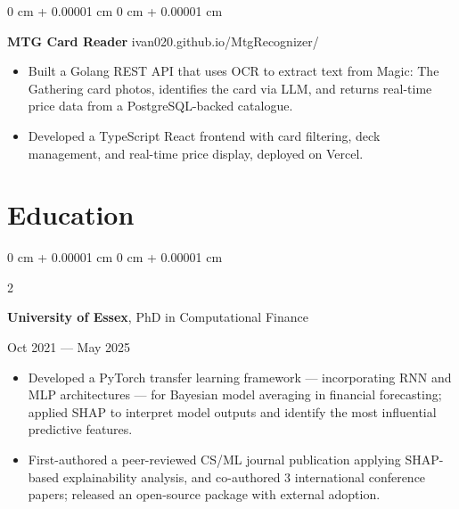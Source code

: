 \documentclass[6pt, letterpaper]{article}
\newenvironment{highlights}{
    \begin{itemize}[
        topsep=0.03 cm,
        parsep=0.03 cm,
        partopsep=0pt,
        itemsep=0pt,
        leftmargin=0 cm + 10pt
    ]
}{
    \end{itemize}
} %
\newenvironment{onecolentry}{
    \begin{adjustwidth}{
        0 cm + 0.00001 cm
    }{
        0 cm + 0.00001 cm
    }
}{
    \end{adjustwidth}
} %
\newenvironment{twocolentry}[2][]{
    \onecolentry
    \def\secondColumn{#2}
    \setcolumnwidth{\fill, 4.5 cm}
    \begin{paracol}{2}
}{
    \switchcolumn \raggedleft \secondColumn
    \end{paracol}
    \endonecolentry
} %
\begin{document}
    \begin{onecolentry}
        \textbf{MTG Card Reader} \hfill ivan020.github.io/MtgRecognizer/

        \begin{highlights}

            \item Built a Golang REST API that uses OCR to extract text from Magic: The Gathering card photos, identifies the card via LLM, and returns real-time price data from a PostgreSQL-backed catalogue.
            \item Developed a TypeScript React frontend with card filtering, deck management, and real-time price display, deployed on Vercel.

        \end{highlights}
    \end{onecolentry}

    \section{Education}

            \begin{twocolentry}{
                Oct 2021 --- May 2025
            }
            \textbf{University of Essex}, PhD in Computational Finance
            \end{twocolentry}

            \begin{highlights}

            \item Developed a PyTorch transfer learning framework — incorporating RNN and MLP architectures — for Bayesian model averaging in financial forecasting; applied SHAP to interpret model outputs and identify the most influential predictive features.
            \item First-authored a peer-reviewed CS/ML journal publication applying SHAP-based explainability analysis, and co-authored 3 international conference papers; released an open-source package with external adoption.

            \end{highlights}
\end{document}
